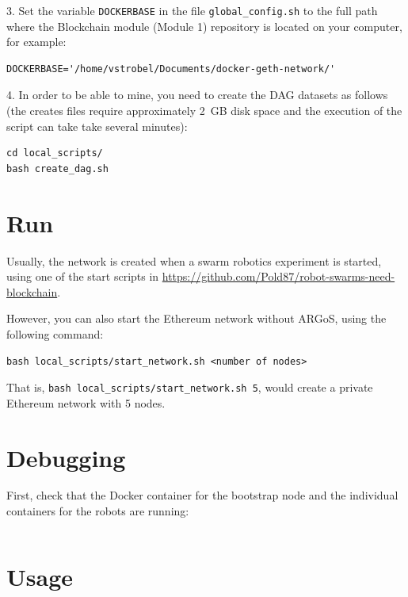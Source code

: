 \documentclass{article}
\begin{document}
3. Set the variable \verb|DOCKERBASE| in the file
\verb|global_config.sh| to the full path where the Blockchain module
(Module 1) repository is located on your computer, for example:

\begin{verbatim}
DOCKERBASE='/home/vstrobel/Documents/docker-geth-network/'
\end{verbatim}

4. In order to be able to mine, you need to create the DAG datasets as
follows (the creates files require approximately 2~GB disk space and
the execution of the script can take take several minutes):

\begin{verbatim}
cd local_scripts/
bash create_dag.sh
\end{verbatim}

\section{Run}

Usually, the network is created when a swarm robotics experiment is
started, using one of the start scripts in
\url{https://github.com/Pold87/robot-swarms-need-blockchain}.

However, you can also start the Ethereum network without ARGoS, using
the following command:

\begin{verbatim}
bash local_scripts/start_network.sh <number of nodes>
\end{verbatim}

That is, \verb|bash local_scripts/start_network.sh 5|, would create a
private Ethereum network with 5 nodes.

\section{Debugging}

First, check that the Docker container for the bootstrap node and the
individual containers for the robots are running:

\begin{verbatim}

\end{verbatim}


\section{Usage}
\end{document}
